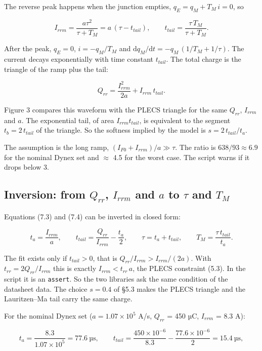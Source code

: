 \documentclass[11pt,a4paper,numbers=noenddot]{scrartcl}
\begin{document}
\begin{onehalfspace}
The reverse peak happens when the junction empties, \(q_E = q_M + T_M\, i = 0\), so

\[I_{rrm} = \frac{a\tau^2}{\tau + T_M} = a\,(\tau - t_{tail}), \qquad t_{tail} = \frac{\tau\, T_M}{\tau + T_M}. \tag{7.3}\]

After the peak, \(q_E = 0\), \(i = -q_M/T_M\) and \(\mathrm{d}q_M/\mathrm{d}t = -q_M\,(1/T_M + 1/\tau)\). The current decays exponentially with time constant \(t_{tail}\). The total charge is the triangle of the ramp plus the tail:

\[Q_{rr} = \frac{I_{rrm}^2}{2a} + I_{rrm}\, t_{tail}. \tag{7.4}\]

Figure 3 compares this waveform with the PLECS triangle for the same \(Q_{rr}\), \(I_{rrm}\) and \(a\). The exponential tail, of area \(I_{rrm} t_{tail}\), is equivalent to the segment \(t_b = 2\,t_{tail}\) of the triangle. So the softness implied by the model is \(s = 2\,t_{tail}/t_a\).

The assumption is the long ramp, \((I_{F0} + I_{rrm})/a \gg \tau\). The ratio is \(638/93 \approx 6.9\) for the nominal Dynex set and \(\approx\) 4.5 for the worst case. The script warns if it drops below 3.

\subsection{\texorpdfstring{Inversion: from \(Q_{rr}\), \(I_{rrm}\) and \(a\) to \(\tau\) and \(T_M\)}{Inversion: from Q\_\{rr\}, I\_\{rrm\} and a to \textbackslash tau and T\_M}}\label{inversion-from-q_rr-i_rrm-and-a-to-tau-and-t_m}

Equations (7.3) and (7.4) can be inverted in closed form:

\[t_a = \frac{I_{rrm}}{a}, \qquad t_{tail} = \frac{Q_{rr}}{I_{rrm}} - \frac{t_a}{2}, \qquad \tau = t_a + t_{tail}, \qquad T_M = \frac{\tau\, t_{tail}}{t_a}. \tag{7.5}\]

The fit exists only if \(t_{tail} > 0\), that is \(Q_{rr}/I_{rrm} > I_{rrm}/(2a)\). With \(t_{rr} = 2Q_{rr}/I_{rrm}\) this is exactly \(I_{rrm} < t_{rr}\, a\), the PLECS constraint (5.3). In the script it is an \texttt{assert}. So the two libraries ask the same condition of the datasheet data. The choice \(s = 0.4\) of \S5.3 makes the PLECS triangle and the Lauritzen--Ma tail carry the same charge.

For the nominal Dynex set (\(a = 1.07 \times 10^5\) A/s, \(Q_{rr}\) = 450 µC, \(I_{rrm}\) = 8.3 A):

\[t_a = \frac{8.3}{1.07 \times 10^5} = 77.6\ \text{µs}, \qquad t_{tail} = \frac{450 \times 10^{-6}}{8.3} - \frac{77.6 \times 10^{-6}}{2} = 15.4\ \text{µs},\]


\end{onehalfspace}
\end{document}
